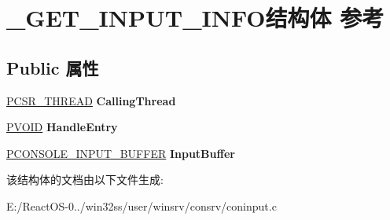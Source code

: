 \hypertarget{struct___g_e_t___i_n_p_u_t___i_n_f_o}{}\section{\+\_\+\+G\+E\+T\+\_\+\+I\+N\+P\+U\+T\+\_\+\+I\+N\+F\+O结构体 参考}
\label{struct___g_e_t___i_n_p_u_t___i_n_f_o}
\subsection*{Public 属性}
\begin{DoxyCompactItemize}
\item 
\mbox{\label{struct___g_e_t___i_n_p_u_t___i_n_f_o_a3e20ca39bfbbd587e14d02554120f3e5}} 
\hyperlink{struct___c_s_r___t_h_r_e_a_d}{P\+C\+S\+R\+\_\+\+T\+H\+R\+E\+AD} {\bfseries Calling\+Thread}
\item 
\mbox{\label{struct___g_e_t___i_n_p_u_t___i_n_f_o_aec182fc1ed0cb51a939d7cbedcde6df3}} 
\hyperlink{interfacevoid}{P\+V\+O\+ID} {\bfseries Handle\+Entry}
\item 
\mbox{\label{struct___g_e_t___i_n_p_u_t___i_n_f_o_a302d646810901e99cb600326cbc678a6}} 
\hyperlink{struct___c_o_n_s_o_l_e___i_n_p_u_t___b_u_f_f_e_r}{P\+C\+O\+N\+S\+O\+L\+E\+\_\+\+I\+N\+P\+U\+T\+\_\+\+B\+U\+F\+F\+ER} {\bfseries Input\+Buffer}
\end{DoxyCompactItemize}


该结构体的文档由以下文件生成\+:\begin{DoxyCompactItemize}
\item 
E\+:/\+React\+O\+S-\/0../win32ss/user/winsrv/consrv/coninput.\+c\end{DoxyCompactItemize}
